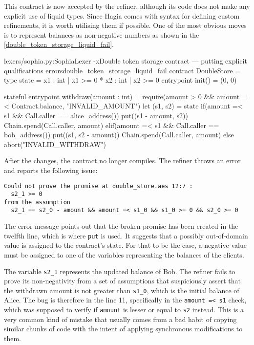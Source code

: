 This contract is now accepted by the refiner, although its code does not make
any explicit use of liquid types. Since Hagia comes with syntax for defining
custom refinements, it is worth utilising them if possible. One of the most
obvious moves is to represent balances as non-negative numbers as shown in the
\autoref{double_token_storage_liquid_fail}.

\begin{code}[H]{lexers/sophia.py:SophiaLexer -x}{Double token storage contract --- putting
    explicit qualifications errors}{double_token_storage_liquid_fail}
contract DoubleStore =
  type state = {x1 : int | x1 >= 0} * {x2 : int | x2 >= 0}
  entrypoint init() = (0, 0)

  stateful entrypoint withdraw(amount : int) =
    require(amount > 0 && amount =< Contract.balance, "INVALID_AMOUNT")
    let (s1, s2) = state
    if(amount =< s1 && Call.caller == alice_address())
      put((s1 - amount, s2))
      Chain.spend(Call.caller, amount)
    elif(amount =< s1 && Call.caller == bob_address())
      put((s1, s2 - amount))
      Chain.spend(Call.caller, amount)
    else
      abort("INVALID_WITHDRAW")
\end{code}

After the changes, the contract no longer compiles. The refiner throws an error
and reports the following issue:

\begin{Verbatim}[samepage=true]
Could not prove the promise at double_store.aes 12:7 :
  s2_1 >= 0
from the assumption
  s2_1 == s2_0 - amount && amount =< s1_0 && s1_0 >= 0 && s2_0 >= 0
\end{Verbatim}

The error message points out that the broken promise has been created in the
twelfth line, which is where \texttt{put} is used. It suggests that a possibly
out-of-domain value is assigned to the contract's state. For that to be the
case, a negative value must be assigned to one of the variables representing the
balances of the clients.

The variable \texttt{s2\_1} represents the updated balance of Bob. The refiner
fails to prove its non-negativity from a set of assumptions that suspiciously
assert that the withdrawn amount is not greater than \texttt{s1\_0}, which is
the initial balance of Alice. The bug is therefore in the line 11, specifically
in the \texttt{amount =< s1} check, which was supposed to verify if
\texttt{amount} is lesser or equal to \texttt{s2} instead. This is a very common
kind of mistake that usually comes from a bad habit of copying similar chunks of
code with the intent of applying synchronous modifications to them.

